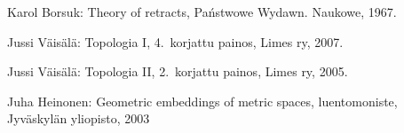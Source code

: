 \documentclass[12pt,a4paper,leqno]{report}
\theoremstyle{plain}
\theoremstyle{definition}
\theoremstyle{remark}
\begin{document}
\begin{thebibliography}{9}

Karol Borsuk: Theory of retracts, %
Państwowe Wydawn. Naukowe, 1967.

Jussi Väisälä: Topologia I, 4.\ korjattu painos, Limes ry, 2007.

Jussi Väisälä: Topologia II, 2.\ korjattu painos, Limes ry, 2005.

Juha Heinonen: Geometric embeddings of metric spaces, luentomoniste, Jyväskylän yliopisto, 2003


\end{thebibliography}
\end{document}
